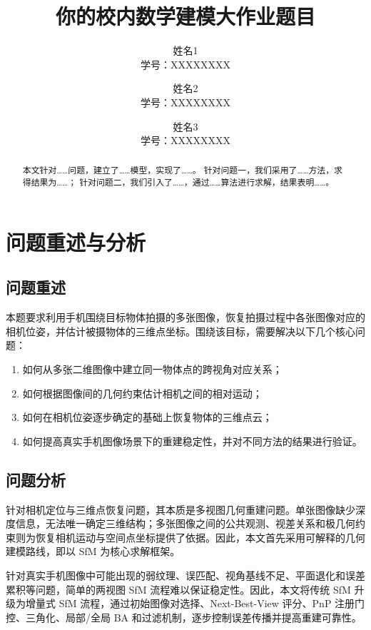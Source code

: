\documentclass[lang=cn,a4paper,newtx]{elegantpaper} %
\title{你的校内数学建模大作业题目}
\author{姓名1 \\ 学号：XXXXXXXX \and 姓名2 \\ 学号：XXXXXXXX \and 姓名3 \\ 学号：XXXXXXXX}
\institute{某某大学 某某学院}
\date{\zhtoday} %
\begin{document}
\maketitle %

\begin{abstract}
本文针对……问题，建立了……模型，实现了……。
针对问题一，我们采用了……方法，求得结果为……；
针对问题二，我们引入了……，通过……算法进行求解，结果表明……。

\end{abstract}

\newpage %

\section{问题重述与分析}

\subsection{问题重述}
本题要求利用手机围绕目标物体拍摄的多张图像，恢复拍摄过程中各张图像对应的相机位姿，并估计被摄物体的三维点坐标。围绕该目标，需要解决以下几个核心问题：
\begin{enumerate}
    \item 如何从多张二维图像中建立同一物体点的跨视角对应关系；
    \item 如何根据图像间的几何约束估计相机之间的相对运动；
    \item 如何在相机位姿逐步确定的基础上恢复物体的三维点云；
    \item 如何提高真实手机图像场景下的重建稳定性，并对不同方法的结果进行验证。
\end{enumerate}

\subsection{问题分析}
针对相机定位与三维点恢复问题，其本质是多视图几何重建问题。单张图像缺少深度信息，无法唯一确定三维结构；多张图像之间的公共观测、视差关系和极几何约束则为恢复相机运动与空间点坐标提供了依据。因此，本文首先采用可解释的几何建模路线，即以 SfM 为核心求解框架。

针对真实手机图像中可能出现的弱纹理、误匹配、视角基线不足、平面退化和误差累积等问题，简单的两视图 SfM 流程难以保证稳定性。因此，本文将传统 SfM 升级为增量式 SfM 流程，通过初始图像对选择、Next-Best-View 评分、PnP 注册门控、三角化、局部/全局 BA 和过滤机制，逐步控制误差传播并提高重建可靠性。
\end{document}

